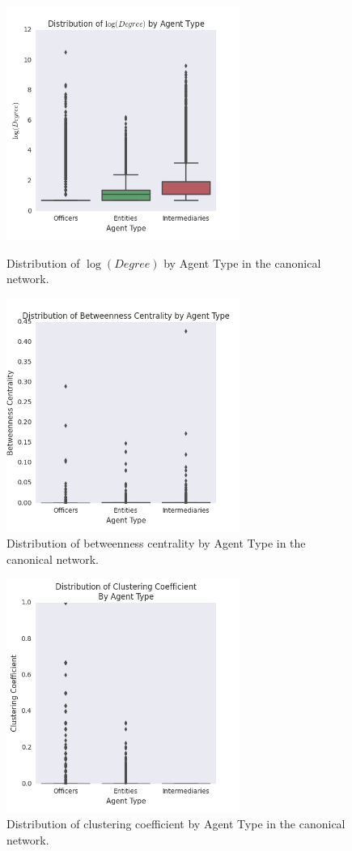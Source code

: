 \documentclass[11pt]{article}
\begin{document}
\begin{figure}[H]
\centering
\begin{minipage}{.5\textwidth}
  \centering
  \includegraphics[width=3in]{figures/figure5.png}
  \caption{Distribution of $\log(Degree)$ by Agent Type in the canonical 
            network.}
  \label{fig5}
\end{minipage}%
\begin{minipage}{.5\textwidth}
  \centering
  \includegraphics[width=3in]{figures/figure6.png}
  \caption{Distribution of betweenness centrality by Agent Type in the canonical
            network.}
  \label{fig6}
\end{minipage}
\end{figure}

\begin{figure}[H]
    \centering
    \includegraphics[width = 3in]{figures/figure7.png}
    \caption{Distribution of clustering coefficient by Agent Type in the
        canonical network.}
\end{figure}
\end{document}
